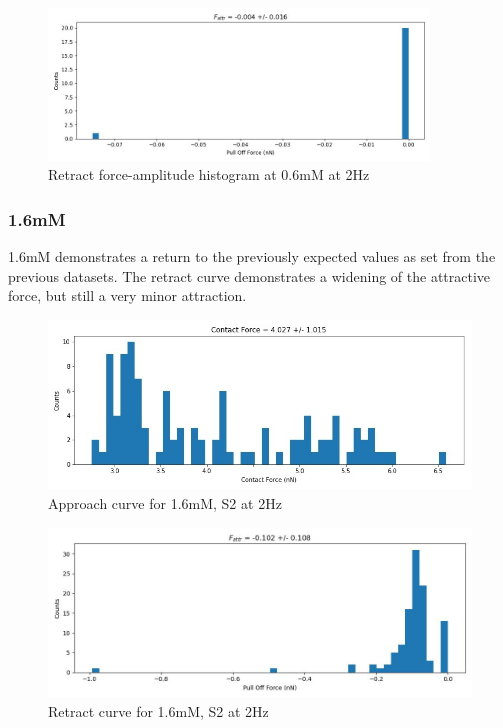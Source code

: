 \begin{figure}[h!!!]
\centering
\includegraphics[width=0.9\textwidth]{chapter7/Tip speed/0.6mM/retract_f_a_hist.jpg}
\caption{Retract force-amplitude histogram at 0.6mM at 2Hz}
\end{figure}



\newpage

\subsubsection*{1.6mM}
1.6mM demonstrates a return to the previously expected values as set from the previous datasets. The retract curve demonstrates a widening of the attractive force, but still a very minor attraction.
\begin{figure}[h!]
\centering
\includegraphics[width=.9\textwidth]{chapter7/Tip speed/1.6mM/S1 2Hz/approach_f_c_hist.jpg}
\caption{Approach curve for 1.6mM, S2 at 2Hz}
\end{figure}

\begin{figure}[h!]
\centering
\includegraphics[width=.9\textwidth]{chapter7/Tip speed/1.6mM/S1 2Hz/retract_f_a_hist.jpg}
\caption{Retract curve for 1.6mM, S2 at 2Hz}
\end{figure}

